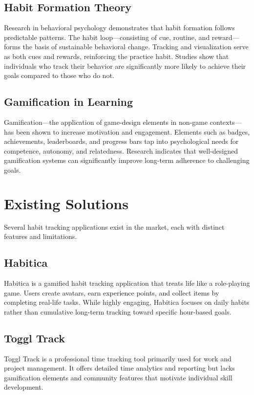 \documentclass[12pt,a4paper]{report}
\newcommand{\JustifiedNormal}{\fontsize{12}{14}\selectfont\justifying\setlength{\parindent}{0pt}}
\begin{document}
\subsection{Habit Formation Theory}
\JustifiedNormal
Research in behavioral psychology demonstrates that habit formation follows predictable patterns. The habit loop—consisting of cue, routine, and reward—forms the basis of sustainable behavioral change. Tracking and visualization serve as both cues and rewards, reinforcing the practice habit. Studies show that individuals who track their behavior are significantly more likely to achieve their goals compared to those who do not.

\subsection{Gamification in Learning}
\JustifiedNormal
Gamification—the application of game-design elements in non-game contexts—has been shown to increase motivation and engagement. Elements such as badges, achievements, leaderboards, and progress bars tap into psychological needs for competence, autonomy, and relatedness. Research indicates that well-designed gamification systems can significantly improve long-term adherence to challenging goals.

\section{Existing Solutions}
\JustifiedNormal
Several habit tracking applications exist in the market, each with distinct features and limitations.

\subsection{Habitica}
\JustifiedNormal
Habitica is a gamified habit tracking application that treats life like a role-playing game. Users create avatars, earn experience points, and collect items by completing real-life tasks. While highly engaging, Habitica focuses on daily habits rather than cumulative long-term tracking toward specific hour-based goals.

\subsection{Toggl Track}
\JustifiedNormal
Toggl Track is a professional time tracking tool primarily used for work and project management. It offers detailed time analytics and reporting but lacks gamification elements and community features that motivate individual skill development.
\end{document}
